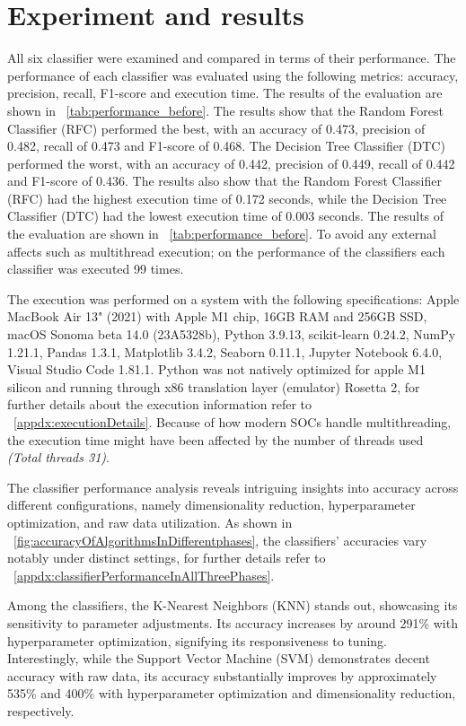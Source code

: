 \documentclass[conference,onecolumn]{IEEEtran}
\begin{document}
          
\section{Experiment and results}
    All six classifier were examined and compared in terms of their performance. The performance of each classifier was evaluated using the following metrics: accuracy, precision, recall, F1-score and execution time. The results of the evaluation are shown in \tablename~\ref{tab:performance_before}. The results show that the Random Forest Classifier (RFC) performed the best, with an accuracy of 0.473, precision of 0.482, recall of 0.473 and F1-score of 0.468. The Decision Tree Classifier (DTC) performed the worst, with an accuracy of 0.442, precision of 0.449, recall of 0.442 and F1-score of 0.436. The results also show that the Random Forest Classifier (RFC) had the highest execution time of 0.172 seconds, while the Decision Tree Classifier (DTC) had the lowest execution time of 0.003 seconds. The results of the evaluation are shown in \tablename~\ref{tab:performance_before}. To avoid any external affects such as multithread execution; on the performance of the classifiers each classifier was executed 99 times.
    
    The execution was performed on a system with the following specifications: Apple MacBook Air 13" (2021) with Apple M1 chip, 16GB RAM and 256GB SSD, macOS Sonoma beta 14.0 (23A5328b), Python 3.9.13, scikit-learn 0.24.2, NumPy 1.21.1, Pandas 1.3.1, Matplotlib 3.4.2, Seaborn 0.11.1, Jupyter Notebook 6.4.0, Visual Studio Code 1.81.1. Python was not natively optimized for apple M1 silicon and running through x86 translation layer (emulator) Rosetta 2, for further details about the execution information refer to \figurename~\ref{appdx:executionDetails}. Because of how modern SOCs handle multithreading, the execution time might have been affected by the number of threads used \emph{(Total threads \= 31)}.

    The classifier performance analysis reveals intriguing insights into accuracy across different configurations, namely dimensionality reduction, hyperparameter optimization, and raw data utilization. As shown in \figurename~\ref{fig:accuracyOfAlgorithmsInDifferentphases}, the classifiers' accuracies vary notably under distinct settings, for further details refer to \tablename~\ref{appdx:classifierPerformanceInAllThreePhases}.

    Among the classifiers, the K-Nearest Neighbors (KNN) stands out, showcasing its sensitivity to parameter adjustments. Its accuracy increases by around 291\% with hyperparameter optimization, signifying its responsiveness to tuning. Interestingly, while the Support Vector Machine (SVM) demonstrates decent accuracy with raw data, its accuracy substantially improves by approximately 535\% and 400\% with hyperparameter optimization and dimensionality reduction, respectively.
\end{document}
